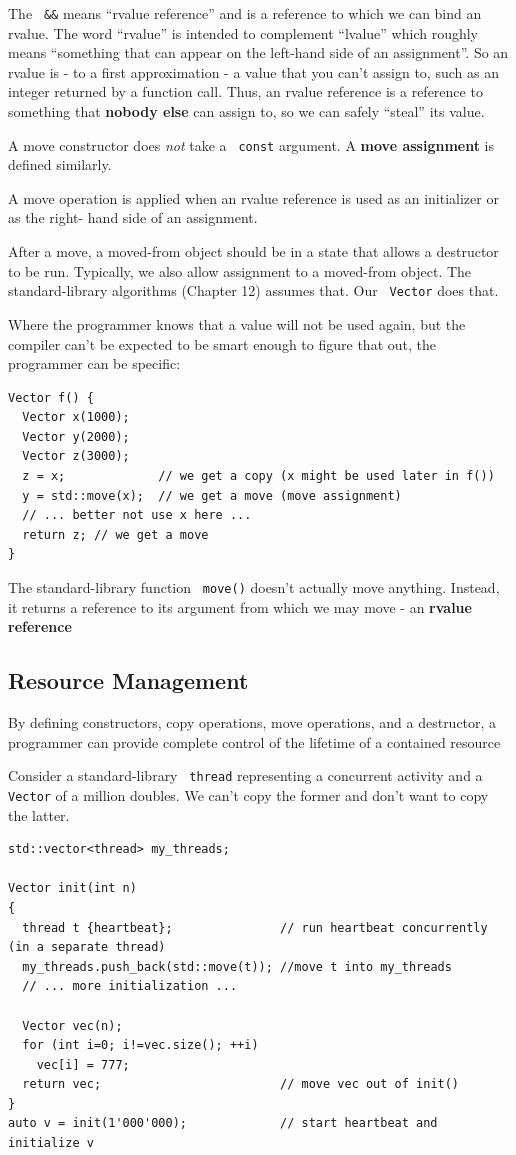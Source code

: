 \documentclass[11pt]{article}
\let\OldTexttt\texttt
\renewcommand{\texttt}[1]{\OldTexttt{\color{MidnightBlue} #1}}
\begin{document}
The \texttt{\&\&} means ``rvalue reference'' and is a reference to which we can bind an rvalue. The word
``rvalue'' is intended to complement ``lvalue'' which roughly means ``something that can appear on
the left-hand side of an assignment''. So an rvalue is - to a first approximation - a value that
you can't assign to, such as an integer returned by a function call. Thus, an rvalue reference
is a reference to something that \textbf{nobody else} can assign to, so we can safely ``steal'' its value.

A move constructor does \emph{not} take a \texttt{const} argument. A \textbf{move assignment} is defined similarly.

A move operation is applied when an rvalue reference is used as an initializer or as the right-
hand side of an assignment.

After a move, a moved-from object should be in a state that allows a destructor to be run.
Typically, we also allow assignment to a moved-from object. The standard-library algorithms
(Chapter 12) assumes that. Our \texttt{Vector} does that.

Where the programmer knows that a value will not be used again, but the compiler can’t be
expected to be smart enough to figure that out, the programmer can be specific:
\begin{verbatim}
Vector f() {
  Vector x(1000);
  Vector y(2000);
  Vector z(3000);
  z = x;             // we get a copy (x might be used later in f())
  y = std::move(x);  // we get a move (move assignment)
  // ... better not use x here ...
  return z; // we get a move
}
\end{verbatim}

The standard-library function \texttt{move()} doesn't actually move anything. Instead, it returns a
reference to its argument from which we may move - an \textbf{rvalue reference}
\subsection{Resource Management}
\label{sec:org1b57b63}

By defining constructors, copy operations, move operations, and a destructor, a programmer can
provide complete control of the lifetime of a contained resource

Consider a standard-library \texttt{thread} representing a concurrent activity and a \texttt{Vector} of
a million doubles. We can't copy the former and don't want to copy the latter.
\begin{verbatim}
std::vector<thread> my_threads;

Vector init(int n)
{
  thread t {heartbeat};               // run heartbeat concurrently (in a separate thread)
  my_threads.push_back(std::move(t)); //move t into my_threads
  // ... more initialization ...
  
  Vector vec(n);
  for (int i=0; i!=vec.size(); ++i)
    vec[i] = 777;
  return vec;                         // move vec out of init()
}
auto v = init(1'000'000);             // start heartbeat and initialize v
\end{verbatim}
\end{document}

